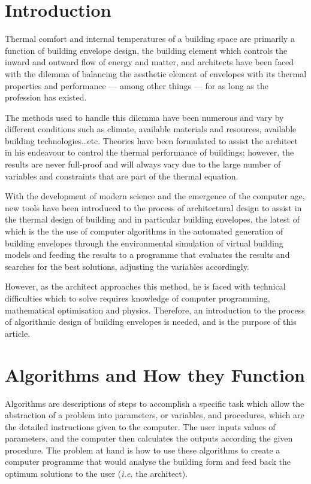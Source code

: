 \documentclass[11pt,a4paper,oneside]{article}
\begin{document}
\begin{multicols}{2}

\section*{Introduction}

Thermal comfort and internal temperatures of a building space are primarily a function of building envelope design, the building element which controls the inward and outward flow of energy and matter, and architects have been faced with the dilemma of balancing the aesthetic element of envelopes with its thermal properties and performance --- among other things --- for as long as the profession has existed.

The methods used to handle this dilemma have been numerous and vary by different conditions such as climate, available materials and resources, available building technologies\ldots{}etc. Theories have been formulated to assist the architect in his endeavour to control the thermal performance of buildings; however, the results are never full-proof and will always vary due to the large number of variables and constraints that are part of the thermal equation.

With the development of modern science and the emergence of the computer age, new tools have been introduced to the process of architectural design to assist in the thermal design of building and in particular building envelopes, the latest of which is the the use of computer algorithms in the automated generation of building envelopes through the environmental simulation of virtual building models and feeding the results to a programme that evaluates the results and searches for the best solutions, adjusting the variables accordingly.

However, as the architect approaches this method, he is faced with technical difficulties which to solve requires knowledge of computer programming, mathematical optimisation and physics. Therefore, an introduction to the process of algorithmic design of building envelopes is needed, and is the purpose of this article.

\section{Algorithms and How they Function}

Algorithms are descriptions of steps to accomplish a specific task which allow the abstraction of a problem into parameters, or variables, and procedures, which are the detailed instructions given to the computer. The user inputs values of parameters, and the computer then calculates the outputs according the given procedure. The problem at hand is how to use these algorithms to create a computer programme that would analyse the building form and feed back the optimum solutions to the user (\emph{i.e.} the architect). 


\end{multicols}
\end{document}
